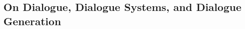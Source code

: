 


\subsection{On Dialogue, Dialogue Systems, and Dialogue Generation}
\label{subsec:background_dialogue}\label{subsec:dialogue_generation_as_lm}



